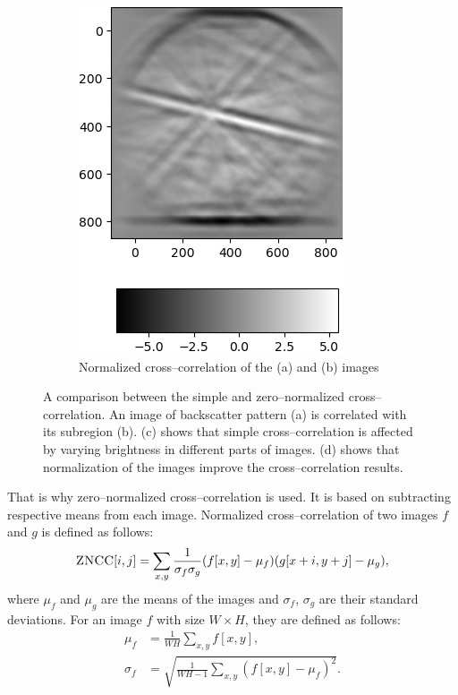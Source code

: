 \begin{figure}
\begin{subfigure}{.49\textwidth}
		\includegraphics[width=\linewidth]{img/normalized_corr}
		\caption{Normalized cross--correlation of the (a) and (b) images}
		\label{normalized-cross}
	\end{subfigure}
	
	\caption{A comparison between the simple and zero--normalized cross--correlation. An image of backscatter pattern (a) is correlated with its subregion (b). (c) shows that simple cross--correlation is affected by varying brightness in different parts of images. (d) shows that normalization of the images improve the cross--correlation results.}
\end{figure}

That is why zero--normalized cross--correlation is used. It is based on subtracting respective means from each image. Normalized cross--correlation of two images $f$ and $g$ is defined as follows:
\[
\textsc{ZNCC}[i,j] = \sum_{x, y} \frac{1}{\sigma_f \sigma_g}(f[x,y] - \mu_f)(g[x+i,y+j] - \mu_g),
\]  
where $\mu_f$ and $\mu_g$ are the means of the images and $\sigma_f$, $\sigma_g$ are their standard deviations. For an image $f$ with size $W \times H$, they are defined as follows:
\begin{align*}
\mu_f &= \frac{1}{WH} \sum_{x,y}{}f[x,y], \\
\sigma_f &= \sqrt{\frac{1}{WH-1} \sum_{x,y}(f[x,y]-\mu_f)^2}.
\end{align*}

